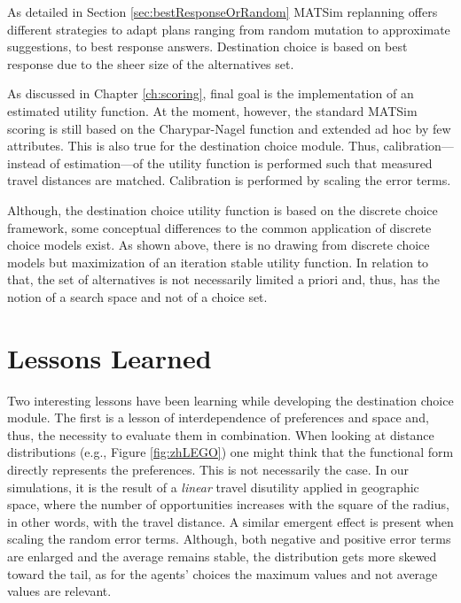 As detailed in Section \ref{sec:bestResponseOrRandom} MATSim replanning offers different strategies to adapt plans ranging from random mutation to approximate suggestions, to best response answers. Destination choice is based on best response due to the sheer size of the alternatives set. 

As discussed in Chapter \ref{ch:scoring}, final goal is the implementation of an estimated utility function. At the moment, however, the standard MATSim scoring is still based on the Charypar-Nagel function and extended ad hoc by few attributes. This is also true for the destination choice module. Thus, calibration---instead of estimation---of the utility function is performed such that measured travel distances are matched. Calibration is performed by scaling the error terms. 

Although, the destination choice utility function is based on the discrete choice framework, some conceptual differences to the common application of discrete choice models exist. As shown above, there is no drawing from discrete choice models but maximization of an iteration stable utility function. In relation to that, the set of alternatives is not necessarily limited a priori and, thus, has the notion of a search space and not of a choice set.

\section{Lessons Learned}
Two interesting lessons have been learning while developing the destination choice module. The first is a lesson of interdependence of preferences and space and,  thus, the necessity to evaluate them in combination. When looking at distance distributions (e.g., Figure \ref{fig:zhLEGO}) one might think that the functional form directly represents the preferences. This is not necessarily the case. In our simulations, it is the result of a \emph{linear} travel disutility applied in geographic space, where the number of opportunities increases with the square of the radius, in other words, with the travel distance. A similar emergent effect is present when scaling the random error terms. Although, both negative and positive error terms are enlarged and the average remains stable, the distribution gets more skewed toward the tail, as for the agents' choices the maximum values and not average values are relevant.

